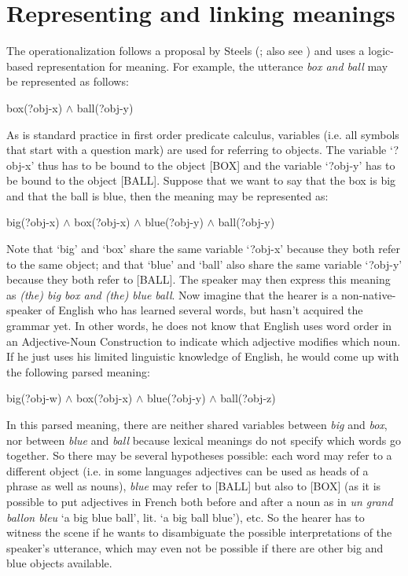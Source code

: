 \section{Representing and linking meanings}
\label{s:linking}

The operationalization follows a proposal by Steels (\citeyear{steels05what}; also see \cite{debeule07compositionality, steels05linking, steels06how-grammar}) and uses a logic-based representation for meaning. For example, the utterance {\em box and ball} may be represented as follows:

\ea
box(?obj-x) $\wedge$ ball(?obj-y)
\z

As is standard practice in first order predicate calculus, variables (i.e. all symbols that start with a question mark) are used for referring to objects. The variable `?obj-x' thus has to be bound to the object [BOX] and the variable `?obj-y' has to be bound to the object [BALL]. Suppose that we want to say that the box is big and that the ball is blue, then the meaning may be represented as:

\ea
\label{m:expressed}
big(?obj-x) $\wedge$ box(?obj-x) $\wedge$ blue(?obj-y) $\wedge$ ball(?obj-y)
\z

Note that `big' and `box' share the same variable `?obj-x' because they both refer to the same object; and that `blue' and `ball' also share the same variable `?obj-y' because they both refer to [BALL]. The speaker may then express this meaning as {\em (the) big box and (the) blue ball}. Now imagine that the hearer is a non-native-speaker of English who has learned several words, but hasn't acquired the grammar yet. In other words, he does not know that English uses word order in an Adjective-Noun Construction to indicate which adjective modifies which noun. If he just uses his limited linguistic knowledge of English, he would come up with the following parsed meaning:

\ea
\label{m:unexpressed}
big(?obj-w) $\wedge$ box(?obj-x) $\wedge$ blue(?obj-y) $\wedge$ ball(?obj-z)
\z

In this parsed meaning, there are neither shared variables between {\em big} and {\em box}, nor between {\em blue} and {\em ball} because lexical meanings do not specify which words go together. So there may be several hypotheses possible: each word may refer to a different object (i.e. in some languages adjectives can be used as heads of a phrase as well as nouns), {\em blue} may refer to [BALL] but also to [BOX] (as it is possible to put adjectives in French both before and after a noun as in {\em un grand ballon bleu} `a big blue ball', lit. `a big ball blue'), etc. So the hearer has to witness the scene if he wants to disambiguate the possible interpretations of the speaker's utterance, which may even not be possible if there are other big and blue objects available.

